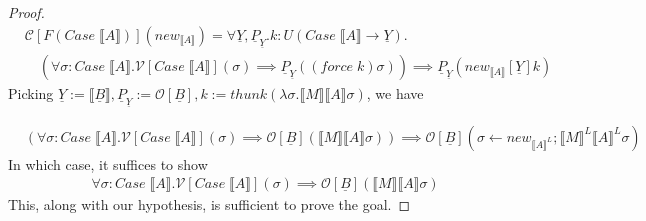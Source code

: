 \documentclass[acmsmall]{acmart}
\newcommand{\den}[1]{\llbracket #1\rrbracket}
\begin{document}
\begin{proof}
  \begin{align*}
    &\mathcal{C}[F(Case\;\den{A})](new_{\den{A}}) = \forall \underline{Y},\underline{P}_{\underline{Y}}.k : U(Case\; \den{A} \to \underline{Y}). \\
    &\quad(\forall \sigma : Case\;\den{A}. \mathcal{V}[Case\;\den{A}](\sigma) \implies \underline{P}_{\underline{Y}}((force\;k)\sigma)) \implies \underline{P}_{\underline{Y}}(new_{\den{A}}[\underline{Y}]k) 
  \end{align*}
Picking $\underline{Y}:=\den{\underline{B}},\underline{P}_{\underline{Y}} := \mathcal{O}[\underline{B}],k:= thunk(\lambda \sigma. \den{M}\den{A}\sigma)$, we have

\begin{align*}
  &(\forall \sigma : Case\;\den{A}. \mathcal{V}[Case\;\den{A}](\sigma) \implies \mathcal{O}[\underline{B}](\den{M}\den{A}\sigma)) \implies\mathcal{O}[\underline{B}](\sigma \leftarrow new_{\den{A}^L};\den{M}^L\den{A}^L\sigma)
\end{align*}
In which case, it suffices to show
\begin{align*}
  &\forall \sigma : Case\;\den{A}. \mathcal{V}[Case\;\den{A}](\sigma) \implies \mathcal{O}[\underline{B}](\den{M}\den{A}\sigma)
\end{align*}
This, along with our hypothesis, is sufficient to prove the goal.

\end{proof}
\end{document}
